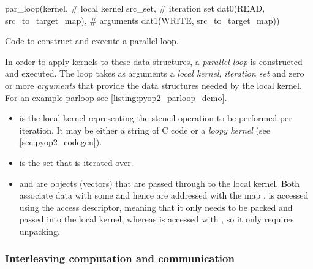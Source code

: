 \documentclass[thesis]{subfiles}
\begin{document}
\begin{listing}
  \centering
  \begin{minipage}{.9\textwidth}
    \begin{pyalg2}
      par_loop(kernel,                          # local kernel
               src_set,                         # iteration set
               dat0(READ, src_to_target_map),   # arguments
               dat1(WRITE, src_to_target_map))
    \end{pyalg2}
  \end{minipage}
  \caption{
    Code to construct and execute a  parallel loop.
  }
  \label{listing:pyop2_parloop_demo}
\end{listing}

In order to apply kernels to these data structures, a \textit{parallel loop} is constructed and executed.
The loop takes as arguments a \textit{local kernel}, \textit{iteration set} and zero or more \textit{arguments} that provide the data structures needed by the local kernel.
For an example parloop see \cref{listing:pyop2_parloop_demo}.

\begin{itemize}
  \item
     is the local kernel representing the stencil operation to be performed per iteration.
    It may be either a string of C code or a \textit{loopy kernel} (see \cref{sec:pyop2_codegen}).
  \item
     is the set that is iterated over.
  \item
     and  are  objects (vectors) that are passed through to the local kernel.
    Both associate data with some  and hence are addressed with the map .
     is accessed using the  access descriptor, meaning that it only needs to be packed and passed into the local kernel, whereas  is accessed with , so it only requires unpacking.
\end{itemize}

\subsubsection{Interleaving computation and communication}
\end{document}
